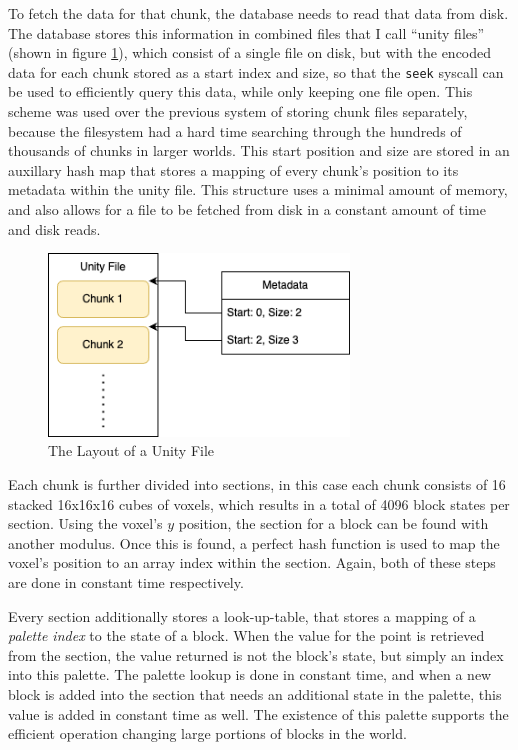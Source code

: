\documentclass[10pt,twocolumn]{article}
\begin{document}
To fetch the data for that chunk, the database needs to read that data from
disk. The database stores this information in combined files that I call ``unity
files'' (shown in figure \ref{fig:unity}), which consist of a single file on disk, but with the encoded data for
each chunk stored as a start index and size, so that the \verb|seek| syscall can
be used to efficiently query this data, while only keeping one file open. This
scheme was used over the previous system of storing chunk files separately,
because the filesystem had a hard time searching through the hundreds of
thousands of chunks in larger worlds. This start position and size are stored in
an auxillary hash map that stores a mapping of every chunk's position to its
metadata within the unity file. This structure uses a minimal amount of memory,
and also allows for a file to be fetched from disk in a constant amount of time
and disk reads.

\begin{figure}
  \centering
  \includegraphics[width=8cm]{unity-file.drawio.png}
  \caption{The Layout of a Unity File}
  \label{fig:unity}
\end{figure}

Each chunk is further divided into sections, in this case each chunk consists of
16 stacked 16x16x16 cubes of voxels, which results in a total of 4096 block
states per section. Using the voxel's $y$ position, the section for a block can
be found with another modulus. Once this is found, a perfect hash function is
used to map the voxel's position to an array index within the section. Again,
both of these steps are done in constant time respectively.

Every section additionally stores a look-up-table, that stores a mapping of a
\textit{palette index} to the state of a block. When the value for the point is
retrieved from the section, the value returned is not the block's state, but
simply an index into this palette. The palette lookup is done in constant time,
and when a new block is added into the section that needs an additional state in
the palette, this value is added in constant time as well. The existence of this
palette supports the efficient operation changing large portions of blocks in
the world.
\end{document}
